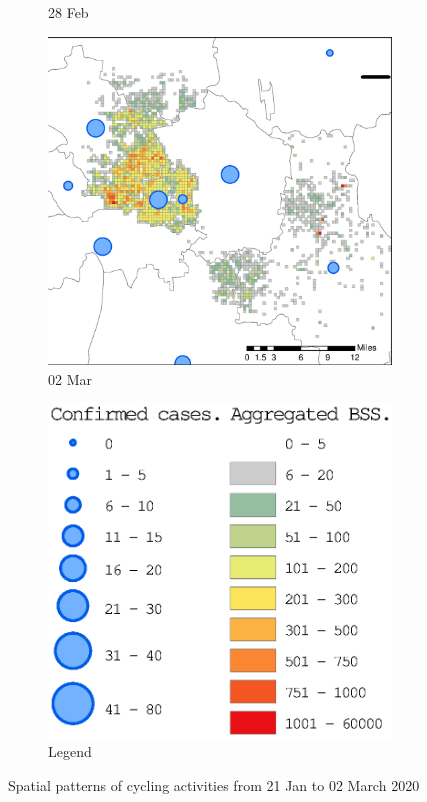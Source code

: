 \documentclass[preprints,ijgi,submit,moreauthors]{Definitions/mdpi}
\begin{document}
\begin{figure}[H]
\begin{subfigure}{.23\textwidth}
        \caption{28 Feb}
    \end{subfigure}
    \begin{subfigure}{.23\textwidth}
        \includegraphics[width=\textwidth]{Figures/Figure7/NewDistrictSSBD2020_03_02.eps}
        \caption{02 Mar}
    \end{subfigure}
    \begin{subfigure}{.2\textwidth}
        \includegraphics[width=\textwidth]{Figures/Figure7/Fig7legend.eps}
        \caption{Legend}
    \end{subfigure}
    
    \caption{Spatial patterns of cycling activities from 21 Jan to 02 March 2020}
    \label{fig:full_spatial_pattern_2020}
\end{figure}
\end{document}
